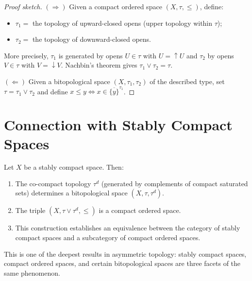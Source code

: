 \begin{proof}[Proof sketch]
$(\Rightarrow)$ Given a compact ordered space $(X,\tau,\leq)$, define:
\begin{itemize}
  \item $\tau_1 =$ the topology of upward-closed opens (upper topology within $\tau$);
  \item $\tau_2 =$ the topology of downward-closed opens.
\end{itemize}
More precisely, $\tau_1$ is generated by opens $U \in \tau$ with $U = \uparrow\! U$ and
$\tau_2$ by opens $V \in \tau$ with $V = \downarrow\! V$. Nachbin's theorem gives
$\tau_1 \vee \tau_2 = \tau$.

$(\Leftarrow)$ Given a bitopological space $(X,\tau_1,\tau_2)$ of the described type, set
$\tau = \tau_1 \vee \tau_2$ and define $x \leq y \Leftrightarrow
x \in \overline{\{y\}}^{\tau_1}$.
\end{proof}

\section{Connection with Stably Compact Spaces}

\begin{theorem}
Let $X$ be a stably compact space. Then:
\begin{enumerate}
  \item The co-compact topology $\tau^d$ (generated by complements of compact saturated
    sets) determines a bitopological space $(X, \tau, \tau^d)$.
  \item The triple $(X, \tau \vee \tau^d, \leq)$ is a compact ordered space.
  \item This construction establishes an equivalence between the category of stably compact
    spaces and a subcategory of compact ordered spaces.
\end{enumerate}
\end{theorem}

\begin{remark}
This is one of the deepest results in asymmetric topology: stably compact spaces, compact
ordered spaces, and certain bitopological spaces are three facets of the same phenomenon.
\end{remark}

